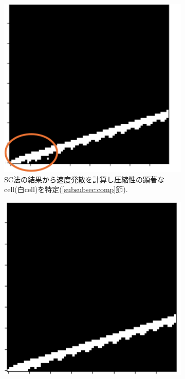 \documentclass[a4j]{jarticle}
\begin{document}
\begin{figure}[h]
  \centering
  \begin{subfigure}[t]{0.235\textwidth}
    \centering
    \includegraphics[width=\linewidth]{extracta.pdf}
    \caption{SC法の結果から速度発散を計算し圧縮性の顕著なcell(白cell)を特定(\ref{subsubsec:comp}節).}
  \end{subfigure}
  \hfill
  \begin{subfigure}[t]{0.23\textwidth}
    \centering
    \includegraphics[width=\linewidth]{extractb.pdf}

\end{subfigure}
\end{figure}
\end{document}
